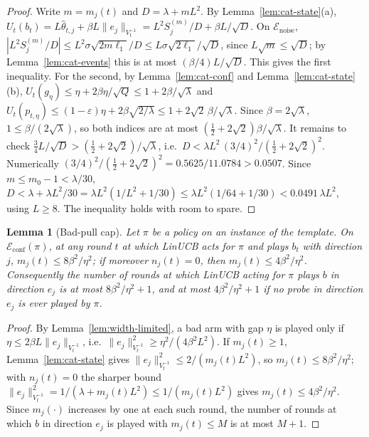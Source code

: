 \documentclass{article}
\newtheorem{lemma}{Lemma}
\theoremstyle{definition}
\theoremstyle{remark}
\newcommand{\eps}{\varepsilon}
\theoremstyle{remark}
\begin{document}
\begin{proof}
Write $m=m_j(t)$ and $D=\lambda+mL^2$. By Lemma~\ref{lem:cat-state}(a),
$U_t(b_t)=L\widehat\theta_{t,j}+\beta L\|e_j\|_{V_t^{-1}}=L^2S_j^{(m)}/D+\beta L/\sqrt D$.
On $\mathcal E_{\mathrm{noise}}$, $|L^2S_j^{(m)}/D|\le L^2\sigma\sqrt{2m\ell_1}/D\le L\sigma\sqrt{2\ell_1}/\sqrt D$,
since $L\sqrt m\le\sqrt D$; by Lemma~\ref{lem:cat-events} this is at most
$(\beta/4)L/\sqrt D$. This gives the first inequality. For the second, by
Lemma~\ref{lem:cat-conf} and Lemma~\ref{lem:cat-state}(b),
$U_t(g_\eta)\le\eta+2\beta\eta/\sqrt Q\le1+2\beta/\sqrt\lambda$ and
$U_t(p_{t,\eta})\le(1-\eps)\eta+2\beta\sqrt{2/\lambda}\le1+2\sqrt2\,\beta/\sqrt\lambda$.
Since $\beta=2\sqrt\lambda$, $1\le\beta/(2\sqrt\lambda)$, so both indices are at
most $(\tfrac12+2\sqrt2)\beta/\sqrt\lambda$. It remains to check
$\tfrac34L/\sqrt D>(\tfrac12+2\sqrt2)/\sqrt\lambda$, i.e.\
$D<\lambda L^2\,(3/4)^2/(\tfrac12+2\sqrt2)^2$. Numerically
$(3/4)^2/(\tfrac12+2\sqrt2)^2=0.5625/11.0784>0.0507$. Since $m\le m_0-1<\lambda/30$,
$D<\lambda+\lambda L^2/30=\lambda L^2(1/L^2+1/30)\le\lambda L^2(1/64+1/30)<0.0491\,\lambda L^2$,
using $L\ge8$. The inequality holds with room to spare.
\end{proof}

\begin{lemma}[Bad-pull cap]
\label{lem:cat-cap}
Let $\pi$ be a policy on an instance of the template. On
$\mathcal E_{\mathrm{conf}}(\pi)$, at any round $t$ at which LinUCB acts for
$\pi$ and plays $b_t$ with direction $j$, $m_j(t)\le8\beta^2/\eta^2$; if
moreover $n_j(t)=0$, then $m_j(t)\le4\beta^2/\eta^2$. Consequently the number
of rounds at which LinUCB acting for $\pi$ plays $b$ in direction $e_j$ is at
most $8\beta^2/\eta^2+1$, and at most $4\beta^2/\eta^2+1$ if no probe in
direction $e_j$ is ever played by $\pi$.
\end{lemma}

\begin{proof}
By Lemma~\ref{lem:width-limited}, a bad arm with gap $\eta$ is played only if
$\eta\le2\beta L\|e_j\|_{V_t^{-1}}$, i.e.\ $\|e_j\|^2_{V_t^{-1}}\ge\eta^2/(4\beta^2L^2)$.
If $m_j(t)\ge1$, Lemma~\ref{lem:cat-state} gives $\|e_j\|^2_{V_t^{-1}}\le2/(m_j(t)L^2)$,
so $m_j(t)\le8\beta^2/\eta^2$; with $n_j(t)=0$ the sharper bound
$\|e_j\|^2_{V_t^{-1}}=1/(\lambda+m_j(t)L^2)\le1/(m_j(t)L^2)$ gives $m_j(t)\le4\beta^2/\eta^2$.
Since $m_j(\cdot)$ increases by one at each such round, the number of rounds
at which $b$ in direction $e_j$ is played with $m_j(t)\le M$ is at most $M+1$.
\end{proof}
\end{document}
